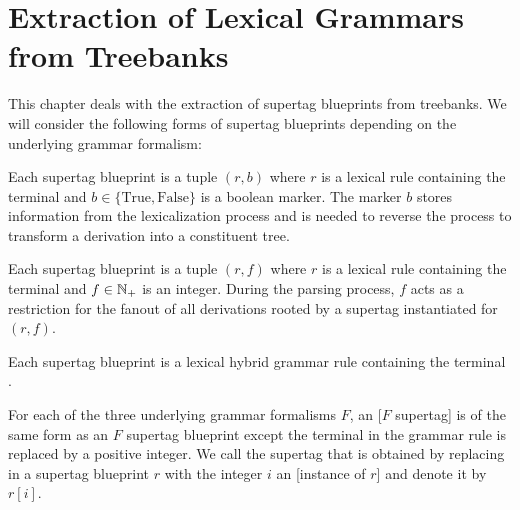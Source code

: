\documentclass[../document.tex]{subfiles}
\begin{document}
    \chapter{Extraction of Lexical Grammars from Treebanks}\label{sec:extraction}
    This chapter deals with the extraction of supertag blueprints from treebanks.
    We will consider the following forms of supertag blueprints depending on the underlying grammar formalism:
    \begin{compactenum}
        \item
            Each  supertag blueprint is a tuple \((r, b)\) where \(r\) is a lexical  rule containing the terminal \wildcard{} and \(b \in \{\text{True}, \text{False}\}\) is a boolean marker.
            The marker \(b\) stores information from the lexicalization process and is needed to reverse the process to transform a derivation into a constituent tree.
        \item
            Each  supertag blueprint is a tuple \((r, f)\) where \(r\) is a lexical  rule containing the terminal \wildcard{} and \(f \in \mathbb{N}_+\) is an integer.
            During the parsing process, \(f\) acts as a restriction for the fanout of all derivations rooted by a supertag instantiated for \((r,f)\).
        \item Each  supertag blueprint is a lexical hybrid grammar rule containing the terminal \wildcard{}.
    \end{compactenum}
    For each of the three underlying grammar formalisms \(F\), an [\(F\) supertag] is of the same form as an \(F\) supertag blueprint except the terminal \wildcard{} in the grammar rule is replaced by a positive integer.
    We call the supertag that is obtained by replacing \wildcard{} in a supertag blueprint \(r\) with the integer \(i\) an [instance of \(r\)] and denote it by \(r[i]\).
\end{document}
